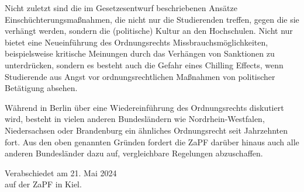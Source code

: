 \documentclass[DIV=calc]{scrartcl}
\let\oldgrqq=\grqq
\def\grqq{\oldgrqq\xspace}
\begin{document}
Nicht zuletzt sind die im Gesetzesentwurf beschriebenen Ansätze Einschüchterungsmaßnahmen, die nicht nur die Studierenden treffen, gegen die sie verhängt werden, sondern die (politische) Kultur an den Hochschulen. Nicht nur bietet eine Neueinführung des Ordnungsrechts Missbrauchsmöglichkeiten, beispielsweise kritische Meinungen durch das Verhängen von Sanktionen zu unterdrücken, sondern es besteht auch die Gefahr eines \glqq Chilling Effects\grqq, wenn Studierende aus Angst vor ordnungsrechtlichen Maßnahmen von politischer Betätigung absehen.

Während in Berlin über eine Wiedereinführung des Ordnungsrechts diskutiert wird, besteht in vielen anderen Bundesländern wie Nordrhein-Westfalen, Niedersachsen oder Brandenburg ein ähnliches Ordnungsrecht seit Jahrzehnten fort. Aus den oben genannten Gründen fordert die ZaPF darüber hinaus auch alle anderen Bundesländer dazu auf, vergleichbare Regelungen abzuschaffen.


%
\vfill
\begin{flushright}
	Verabschiedet am 21. Mai 2024 \\
	auf der ZaPF in Kiel.
\end{flushright}
\end{document}

